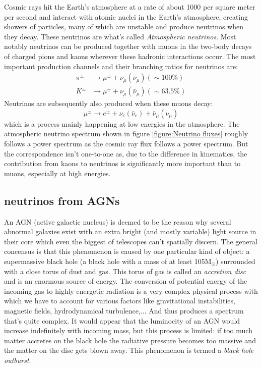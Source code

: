Cosmic rays hit the Earth's atmosphere at a rate of about 1000 per square meter
per second and interact with atomic nuclei in the Earth's atmosphere, creating
showers of particles, many of which are unstable and produce neutrinos when
they decay. These neutrinos are what's called \textit{Atmospheric neutrinos}.
Most notably neutrinos can be produced together with muons in the two-body
decays of charged pions and kaons wherever these hadronic interactions occur.
The most important production channels and their branching ratios for neutrinos
are:
\begin{align}
	\pi^\pm &\rightarrow \mu^\pm + \nu_\mu(\bar{\nu}_\mu) (\sim 100\%)\\
	K^\pm &\rightarrow \mu^\pm + \nu_\mu(\bar{\nu}_\mu) (\sim 63.5\%)
\end{align}
Neutrinos are subsequently also produced when these muons decay:
\begin{equation}
	\mu^\pm \rightarrow e^\pm + \nu_e(\bar{\nu}_e) + \bar{\nu}_\mu(\nu_\mu)
\end{equation}
which is a process mainly happening at low energies in the atmosphere.  The
atmospheric neutrino spectrum shown in figure \ref{figure:Neutrino
fluxes} roughly follows a power spectrum as the cosmic ray flux follows a power
spectrum. But the correspondence isn't one-to-one as, due to the difference in
kinematics, the contribution from kaons to neutrinos is significantly more
important than to muons, especially at high energies.

\subsection{neutrinos from AGNs}
An AGN (active galactic nucleus) is deemed to be the reason why several abnormal galaxies exist with
an extra bright (and mostly variable) light source in their core which even the biggest of telescopes
can't spatially discern. The general concensus is that this phenomenon is caused by one particular
kind of object: a supermassive black hole (a black hole with a mass of at least 105M$_\odot$) surrounded with
a close torus of dust and gas.
This torus of gas is called an \textit{accretion disc} and is an enormous source of energy. The conversion
of potential energy of the incoming gas to highly energetic radiation is a very complex physical process
with which we have to account for various factors like gravitational instabilities, magnetic fields, hydrodynamical
turbulence,... And thus produces a spectrum that's quite complex.
It would appear that the luminocity of an AGN would increase indefinitely with incoming mass, but this process is 
limited: if too much matter accretes on the black hole the radiative pressure becomes too massive and the 
matter on the disc gets blown away. This phenomenon is termed a \textit{black hole outburst}.

